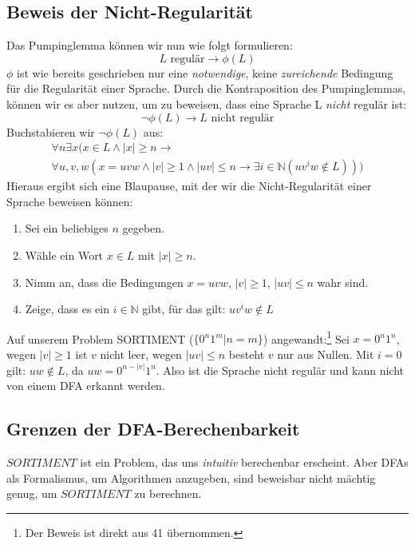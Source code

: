 \subsection{Beweis der Nicht-Regularität}
Das Pumpinglemma können wir nun wie folgt formulieren:
\[
    L \text{ regulär} \rightarrow \phi(L)
\]
$\phi$ ist wie bereits geschrieben nur eine \emph{notwendige},
keine \emph{zureichende} Bedingung für die Regularität einer Sprache.
Durch die Kontraposition des Pumpinglemmas, können wir es aber nutzen,
um zu beweisen, dass eine Sprache L \emph{nicht} regulär ist:
\[
    \neg \phi(L) \rightarrow L \text{ nicht regulär}
\]
Buchstabieren wir $\neg \phi(L)$ aus:
\begin{multline*}
    \forall n \exists x
    (
        x \in L
        \wedge  |x| \geq n
        \rightarrow \\
        \forall u,v,w (
            x = uvw
            \wedge  |v| \geq 1
            \wedge  |uv| \leq n
            \rightarrow  \exists i \in \mathbb{N} (uv^iw \notin L)
        )
    )
\end{multline*}
Hieraus ergibt sich eine Blaupause,
mit der wir die Nicht-Regularität einer Sprache beweisen können:
\begin{enumerate}
    \item Sei ein beliebiges $n$ gegeben.
    \item Wähle ein Wort $x \in L$ mit $|x| \geq n $.
    \item Nimm an, dass die Bedingungen $x = uvw$, $|v| \geq 1$, $|uv| \leq n$ wahr sind.
    \item Zeige, dass es ein $i \in \mathbb{N}$ gibt, für das gilt: $uv^iw \notin L$
\end{enumerate}

Auf unserem Problem SORTIMENT ($\{0^n1^m|n=m\}$) angewandt:\footnote{Der Beweis ist direkt aus \cite{schoening} 41 übernommen.}
Sei $x = 0^n1^n$, wegen $|v| \geq 1$ ist $v$ nicht leer,
wegen $|uv| \leq n$ besteht $v$ nur aus Nullen.
Mit $i = 0$ gilt: $uw \notin L$, da $uw = 0^{n-|v|}1^n$.
Also ist die Sprache nicht regulär und kann nicht von einem DFA erkannt werden.

\subsection{Grenzen der DFA-Berechenbarkeit}
$SORTIMENT$ ist ein Problem, das uns \emph{intuitiv} berechenbar erscheint.
Aber DFAs als Formalismus, um Algorithmen anzugeben,
sind beweisbar nicht mächtig genug,
um $SORTIMENT$ zu berechnen.

